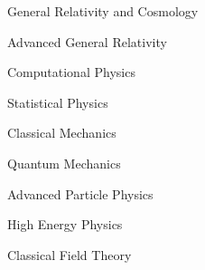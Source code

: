 \color{black}

\begin{minipage}[t]{.4\linewidth}
  \begin{cvitems}
    \item General Relativity and Cosmology
    \item Advanced General Relativity
    \item Computational Physics
  \end{cvitems}
\end{minipage}%
\begin{minipage}[t]{.3\linewidth}
  \begin{cvitems}
    \item Statistical Physics
    \item Classical Mechanics
    \item Quantum Mechanics
  \end{cvitems}
\end{minipage}%
\begin{minipage}[t]{.3\linewidth}
  \begin{cvitems}
    \item Advanced Particle Physics
    \item High Energy Physics
    \item Classical Field Theory
  \end{cvitems}
\end{minipage}%


\vspace{4 mm}